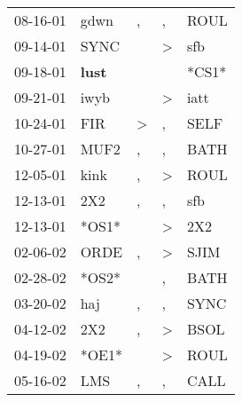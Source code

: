 \begin{supertabular}{p{0.07\textwidth}p{0.06\textwidth}p{0.02\textwidth}p{0.02\textwidth}p{0.06\textwidth}}
          08-16-01\textsuperscript{} &           gdwn\textsuperscript{} &             , &                , &           ROUL\textsuperscript{} \\
          09-14-01\textsuperscript{} &           SYNC\textsuperscript{} &               &     \textgreater &            sfb\textsuperscript{} \\
          09-18-01\textsuperscript{} &  \textbf{lust\textsuperscript{}} &               &                  &                            *CS1* \\
          09-21-01\textsuperscript{} &           iwyb\textsuperscript{} &               &     \textgreater &           iatt\textsuperscript{} \\
          10-24-01\textsuperscript{} &            FIR\textsuperscript{} &  \textgreater &                , &           SELF\textsuperscript{} \\
          10-27-01\textsuperscript{} &           MUF2\textsuperscript{} &             , &                , &           BATH\textsuperscript{} \\
          12-05-01\textsuperscript{} &           kink\textsuperscript{} &             , &     \textgreater &           ROUL\textsuperscript{} \\
          12-13-01\textsuperscript{} &            2X2\textsuperscript{} &             , &                , &            sfb\textsuperscript{} \\
          12-13-01\textsuperscript{} &                            *OS1* &               &     \textgreater &            2X2\textsuperscript{} \\
          02-06-02\textsuperscript{} &           ORDE\textsuperscript{} &             , &     \textgreater &           SJIM\textsuperscript{} \\
          02-28-02\textsuperscript{} &                            *OS2* &               &                , &           BATH\textsuperscript{} \\
          03-20-02\textsuperscript{} &            haj\textsuperscript{} &             , &                , &           SYNC\textsuperscript{} \\
          04-12-02\textsuperscript{} &            2X2\textsuperscript{} &             , &     \textgreater &           BSOL\textsuperscript{} \\
          04-19-02\textsuperscript{} &                            *OE1* &               &     \textgreater &           ROUL\textsuperscript{} \\
          05-16-02\textsuperscript{} &            LMS\textsuperscript{} &             , &                , &           CALL\textsuperscript{} \\

\end{supertabular}
